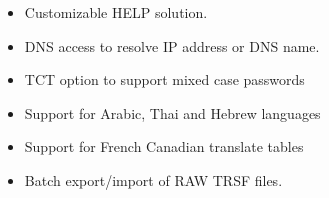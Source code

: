 \documentclass[letterpaper,10pt,english]{sphinxmanual}
\begin{document}
\begin{itemize}
\item {} 
Customizable HELP solution.

\item {} 
DNS access to resolve IP address or DNS name.

\item {} 
TCT option to support mixed case passwords

\item {} 
Support for Arabic, Thai and Hebrew languages

\item {} 
Support for French Canadian translate tables

\item {} 
Batch export/import of RAW TRSF files.

\end{itemize}



\renewcommand{\indexname}{Index}
\printindex
\end{document}
